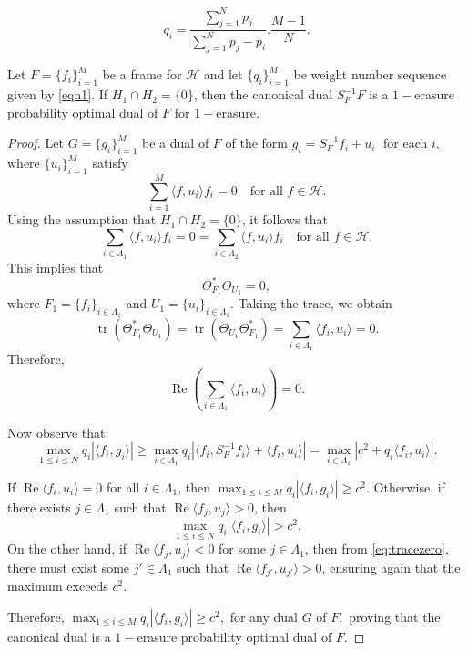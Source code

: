 \documentclass[10pt,a4paper]{amsart}
\begin{document}
\begin{equation}\label{eqn1}
    q_i = \dfrac{\sum\limits_{j=1}^N p_j}{\sum\limits_{j=1}^N p_j - p_i}. \dfrac{M-1}{N}.
\end{equation}

\begin{thm}\label{thm3point1}
Let $F = \{f_i\}_{i=1}^M$ be a frame for $\mathcal{H}$ and let $\{q_i\}_{i=1}^M$ be  weight number sequence given by \eqref{eqn1}. If $H_1 \cap H_2 = \{0\}$, then the canonical dual $S_{F}^{-1}F$ is a $1-$erasure probability optimal dual of $F$ for $1-$erasure.
\end{thm}

\begin{proof}
Let $G = \{g_i\}_{i=1}^M$ be a dual of $F$ of the form $g_i = S_F^{-1}f_i + u_i \;$ for each $i$, where  $\{u_i\}_{i=1}^M$ satisfy
\[
\sum_{i=1}^M \langle f, u_i \rangle f_i = 0 \quad \text{for all } f \in \mathcal{H}.
\]
Using the assumption that $H_1 \cap H_2 = \{0\}$, it follows that
\[
\sum_{i \in \Lambda_1} \langle f, u_i \rangle f_i = 0 = \sum_{i \in \Lambda_2} \langle f, u_i \rangle f_i\quad \text{for all } f \in \mathcal{H}.
\]
This implies that
\[
\Theta_{F_1}^* \Theta_{U_1} = 0,
\]
where $F_1 = \{f_i\}_{i \in \Lambda_1}$ and $U_1 = \{u_i\}_{i \in \Lambda_1}$. Taking the trace, we obtain
\[
\operatorname{tr}\left(\Theta_{F_1}^* \Theta_{U_1}\right) = \operatorname{tr}\left(\Theta_{U_1} \Theta_{F_1}^*\right) = \sum_{i \in \Lambda_1} \langle f_i, u_i \rangle = 0.
\]
Therefore,
\begin{equation} \label{eq:tracezero}
\operatorname{Re} \left( \sum_{i \in \Lambda_1} \langle f_i, u_i \rangle \right) = 0.
\end{equation}

Now observe that:
\[
\max_{1 \leq i \leq N} q_i |\langle f_i, g_i \rangle|
\geq \max_{i \in \Lambda_1} q_i |\langle f_i, S_F^{-1} f_i \rangle + \langle f_i, u_i \rangle|
= \max_{i \in \Lambda_1} \left| c^2 + q_i \langle f_i, u_i \rangle \right|.
\]

If $\operatorname{Re} \langle f_i, u_i \rangle = 0$ for all $i \in \Lambda_1$, then $\max_{1 \leq i \leq M} q_i |\langle f_i, g_i \rangle| \geq c^2.$ Otherwise, if there exists $j \in \Lambda_1$ such that $\operatorname{Re} \langle f_j, u_j \rangle > 0$, then
\[
\max_{1 \leq i \leq N} q_i |\langle f_i, g_i \rangle| > c^2.
\]
On the other hand, if $\operatorname{Re} \langle f_j, u_j \rangle < 0$ for some $j \in \Lambda_1$, then from \eqref{eq:tracezero}, there must exist some $j' \in \Lambda_1$ such that $\operatorname{Re} \langle f_{j'}, u_{j'} \rangle > 0$, ensuring again that the maximum exceeds $c^2$.

Therefore, $\max_{1 \leq i \leq M} q_i |\langle f_i, g_i \rangle| \geq c^2,$ for any dual $G$ of $F,$ proving that the canonical dual is a $1-$erasure probability optimal dual of $F$.

\end{proof}
\end{document}
